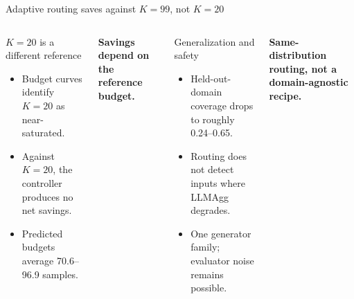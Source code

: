 \documentclass[aspectratio=169,10pt]{beamer}
\begin{document}
\begin{frame}{Adaptive routing saves against $K=99$, not $K=20$}
  \begin{columns}[T,onlytextwidth]
      \begin{block}{$K=20$ is a different reference}
        \begin{itemize}
          \item Budget curves identify $K=20$ as near-saturated.
          \item Against $K=20$, the controller produces no net savings.
          \item Predicted budgets average 70.6--96.9 samples.
        \end{itemize}
      \end{block}
      \vspace{5pt}
      \centering
      \textbf{Savings depend on the reference budget.}
      \begin{alertblock}{Generalization and safety}
        \begin{itemize}
          \item Held-out-domain coverage drops to roughly 0.24--0.65.
          \item Routing does not detect inputs where LLMAgg degrades.
          \item One generator family; evaluator noise remains possible.
        \end{itemize}
      \end{alertblock}
      \vspace{5pt}
      \centering
      \textbf{Same-distribution routing, not a domain-agnostic recipe.}
  \end{columns}
\end{frame}
\end{document}
